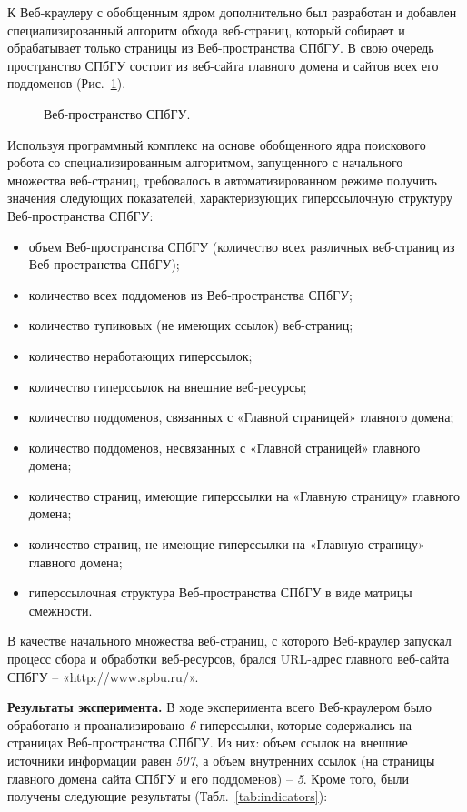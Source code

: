  К Веб-краулеру с обобщенным ядром дополнительно был разработан и добавлен специализированный алгоритм обхода веб-страниц, который собирает и обрабатывает только страницы из Веб-пространства СПбГУ. В свою очередь пространство СПбГУ состоит из веб-сайта главного домена и сайтов всех его поддоменов (Рис.~\cref{fig:spbuWebSpace}).
 
\begin{figure}[ht]
    \caption{Веб-пространство СПбГУ.}\label{fig:spbuWebSpace}
\end{figure}

Используя программный комплекс на основе обобщенного ядра поискового робота со специализированным алгоритмом, запущенного с начального множества веб-страниц, требовалось в автоматизированном режиме получить значения следующих показателей, характеризующих гиперссылочную структуру Веб-пространства СПбГУ:
\begin{itemize}
	\item объем Веб-пространства СПбГУ (количество всех различных веб-страниц из Веб-пространства СПбГУ);
	\item количество всех поддоменов из Веб-пространства СПбГУ; 
	\item количество тупиковых (не имеющих ссылок) веб-страниц; 
	\item количество неработающих гиперссылок; 
	\item количество гиперссылок на внешние веб-ресурсы; 
	\item количество поддоменов, связанных с «Главной страницей» главного домена; 
	\item количество поддоменов, несвязанных с «Главной страницей» главного домена; 
	\item количество страниц, имеющие гиперссылки на «Главную страницу» главного домена; 
	\item количество страниц, не имеющие гиперссылки на «Главную страницу» главного домена; 
	\item гиперссылочная структура Веб-пространства СПбГУ в виде матрицы смежности. 
\end{itemize}

В качестве начального множества веб-страниц, с которого Веб-краулер запускал процесс сбора и обработки веб-ресурсов, брался URL-адрес главного веб-сайта СПбГУ -- «http://www.spbu.ru/».

\textbf{Результаты эксперимента.} В ходе эксперимента всего Веб-краулером было обработано и проанализировано \textit{6} гиперссылки, которые содержались на страницах Веб-пространства СПбГУ. Из них: объем ссылок на внешние источники информации равен \textit{507}, а объем внутренних ссылок (на страницы главного домена сайта СПбГУ и его поддоменов) -- \textit{5}. Кроме того, были получены следующие результаты (Табл.~\cref{tab:indicators}):

